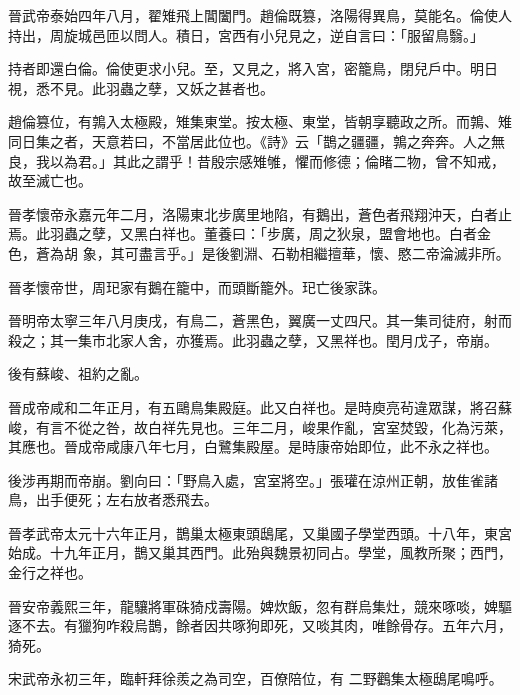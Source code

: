 \begin{pinyinscope}
 晉武帝泰始四年八月，翟雉飛上閶闔門。趙倫既篡，洛陽得異鳥，莫能名。倫使人持出，周旋城邑匝以問人。積日，宮西有小兒見之，逆自言曰：「服留鳥翳。」



 持者即還白倫。倫使更求小兒。至，又見之，將入宮，密籠鳥，閉兒戶中。明日視，悉不見。此羽蟲之孽，又妖之甚者也。



 趙倫篡位，有鶉入太極殿，雉集東堂。按太極、東堂，皆朝享聽政之所。而鶉、雉同日集之者，天意若曰，不當居此位也。《詩》云「鵲之疆疆，鶉之奔奔。人之無良，我以為君。」其此之謂乎！昔殷宗感雉雊，懼而修德；倫睹二物，曾不知戒，故至滅亡也。



 晉孝懷帝永嘉元年二月，洛陽東北步廣里地陷，有鵝出，蒼色者飛翔沖天，白者止焉。此羽蟲之孽，又黑白祥也。董養曰：「步廣，周之狄泉，盟會地也。白者金色，蒼為胡
 象，其可盡言乎。」是後劉淵、石勒相繼擅華，懷、愍二帝淪滅非所。



 晉孝懷帝世，周𤣱家有鵝在籠中，而頭斷籠外。𤣱亡後家誅。



 晉明帝太寧三年八月庚戌，有鳥二，蒼黑色，翼廣一丈四尺。其一集司徒府，射而殺之；其一集市北家人舍，亦獲焉。此羽蟲之孽，又黑祥也。閏月戊子，帝崩。



 後有蘇峻、祖約之亂。



 晉成帝咸和二年正月，有五鷗鳥集殿庭。此又白祥也。是時庾亮茍違眾謀，將召蘇峻，有言不從之咎，故白祥先見也。三年二月，峻果作亂，宮室焚毀，化為污萊，其應也。晉成帝咸康八年七月，白鷺集殿屋。是時康帝始即位，此不永之祥也。



 後涉再期而帝崩。劉向曰：「野鳥入處，宮室將空。」張瓘在涼州正朝，放隹雀諸鳥，出手便死；左右放者悉飛去。



 晉孝武帝太元十六年正月，鵲巢太極東頭鴟尾，又巢國子學堂西頭。十八年，東宮始成。十九年正月，鵲又巢其西門。此殆與魏景初同占。學堂，風教所聚；西門，金行之祥也。



 晉安帝義熙三年，龍驤將軍硃猗戍壽陽。婢炊飯，忽有群烏集灶，競來啄啖，婢驅逐不去。有獵狗咋殺烏鵲，餘者因共啄狗即死，又啖其肉，唯餘骨存。五年六月，猗死。



 宋武帝永初三年，臨軒拜徐羨之為司空，百僚陪位，有
 二野鸛集太極鴟尾鳴呼。




\end{pinyinscope}
